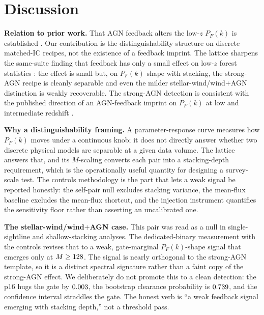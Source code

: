 \section{Discussion}
\label{sec:discussion}

\textbf{Relation to prior work.} That AGN feedback alters the low-$z$ $P_F(k)$ is
established \citep{Pirecki2025,TillmanApJ2024}. Our contribution is the
distinguishability structure on discrete matched-IC recipes, not the existence of
a feedback imprint. The lattice sharpens the same-suite finding that feedback has
only a small effect on low-$z$ forest statistics \citep{Nasir2017}: the effect is
small but, on $P_F(k)$ shape with stacking, the strong-AGN recipe is cleanly
separable and even the milder stellar-wind/wind${+}$AGN distinction is weakly
recoverable. The strong-AGN detection is consistent with the published direction
of an AGN-feedback imprint on $P_F(k)$ at low and intermediate redshift
\citep{Khaire2024,TillmanApJ2024}.

\textbf{Why a distinguishability framing.} A parameter-response curve measures how
$P_F(k)$ moves under a continuous knob; it does not directly answer whether two
discrete physical models are separable at a given data volume. The lattice answers
that, and its $M$-scaling converts each pair into a stacking-depth requirement,
which is the operationally useful quantity for designing a survey-scale test. The
controls methodology is the part that lets a weak signal be reported honestly: the
self-pair null excludes stacking variance, the mean-flux baseline excludes the
mean-flux shortcut, and the injection instrument quantifies the sensitivity floor
rather than asserting an uncalibrated one.

\textbf{The stellar-wind/wind${+}$AGN case.} This pair was read as a null in
single-sightline and shallow-stacking analyses. The dedicated-binary measurement
with the controls revises that to a weak, gate-marginal $P_F(k)$-shape signal that
emerges only at $M\geq128$. The signal is nearly orthogonal to the strong-AGN
template, so it is a distinct spectral signature rather than a faint copy of the
strong-AGN effect. We deliberately do not promote this to a clean detection: the
p16 hugs the gate by $0.003$, the bootstrap clearance probability is
$0.739$, and the confidence interval straddles the gate. The honest verb is
``a weak feedback signal emerging with stacking depth,'' not a threshold pass.

